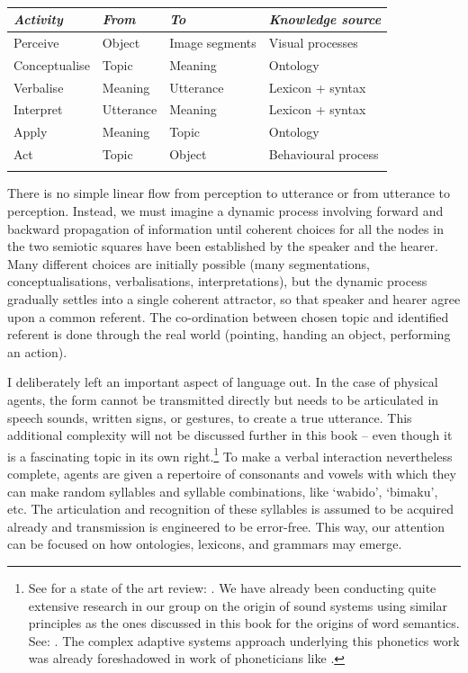 \begin{table}[htbp]
\caption{}
\label{tab:2:findthereferent}
\begin{tabular}{ l  l  l  l }
\lsptoprule
{\itshape Activity} & {\itshape From} & {\itshape To} & {\itshape Knowledge source}\\ \midrule
Perceive & Object & Image segments & Visual processes \\ 
Conceptualise & Topic & Meaning & Ontology  \\ 
Verbalise & Meaning & Utterance & Lexicon + syntax \\  
Interpret & Utterance & Meaning & Lexicon + syntax \\ 
Apply & Meaning & Topic & Ontology \\ 
Act & Topic & Object & Behavioural process  \\ 
\lspbottomrule
\end{tabular}
\end{table}
There is no simple linear flow from perception to utterance 
or from utterance to perception. Instead, we must imagine a dynamic process 
involving forward and backward propagation of information 
until coherent choices for all the nodes in the two
semiotic squares have been established by the speaker and 
the hearer. Many different choices are initially possible 
(many segmentations, conceptualisations, verbalisations, 
interpretations), but the dynamic process gradually settles into 
a single coherent attractor, so that speaker and hearer 
agree upon a common referent. The co-ordination between 
chosen topic and identified referent is done through 
the real world (pointing, handing an object, performing
an action). 

I deliberately left an important aspect of language out. 
In the case of physical agents, the form cannot be transmitted
directly but needs to be articulated in speech sounds, 
written signs, or gestures, to create a true utterance. This additional 
complexity will not be discussed further in this book -- even though 
it is a fascinating topic in its own right.\footnote{
See for a state of the art review: \cite{Clark:1990}. 
We have already been conducting quite extensive 
research in our group on the origin of sound systems 
using similar principles as the ones discussed in this 
book for the origins of word semantics. 
See: \cite{DeBoer:1997}. The complex 
adaptive systems approach underlying this phonetics
work was already foreshadowed in work of phoneticians
like \cite{Liljencrants:1972}.}
To make a verbal interaction nevertheless complete, agents
are given a repertoire of consonants and vowels with 
which they can make random syllables and syllable combinations, 
like `wabido', `bimaku', etc. The articulation and 
recognition of these syllables is assumed to be acquired
already and transmission is engineered to be error-free. 
This way, our attention can be focused on how
ontologies, lexicons, and grammars may emerge. 

